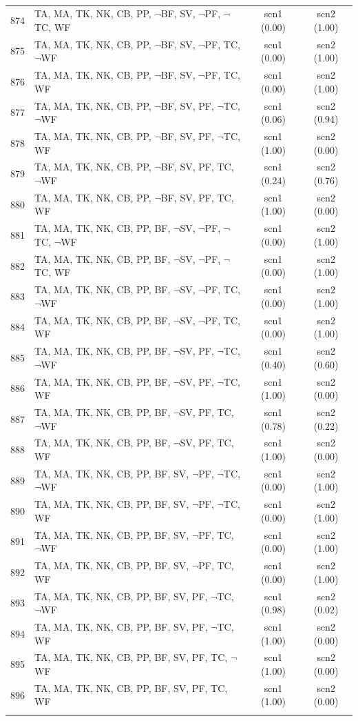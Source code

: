 \documentclass[12pt]{article}
\begin{document}
\begin{longtable}{|l|l|c|c|}
874 & TA, MA, TK, NK, CB, PP, $\neg$BF, SV, $\neg$PF, $\neg$TC, WF & scn1 (0.00) & scn2 (1.00)\\
875 & TA, MA, TK, NK, CB, PP, $\neg$BF, SV, $\neg$PF, TC, $\neg$WF & scn1 (0.00) & scn2 (1.00)\\
876 & TA, MA, TK, NK, CB, PP, $\neg$BF, SV, $\neg$PF, TC, WF & scn1 (0.00) & scn2 (1.00)\\
877 & TA, MA, TK, NK, CB, PP, $\neg$BF, SV, PF, $\neg$TC, $\neg$WF & scn1 (0.06) & scn2 (0.94)\\
878 & TA, MA, TK, NK, CB, PP, $\neg$BF, SV, PF, $\neg$TC, WF & scn1 (1.00) & scn2 (0.00)\\
879 & TA, MA, TK, NK, CB, PP, $\neg$BF, SV, PF, TC, $\neg$WF & scn1 (0.24) & scn2 (0.76)\\
880 & TA, MA, TK, NK, CB, PP, $\neg$BF, SV, PF, TC, WF & scn1 (1.00) & scn2 (0.00)\\
881 & TA, MA, TK, NK, CB, PP, BF, $\neg$SV, $\neg$PF, $\neg$TC, $\neg$WF & scn1 (0.00) & scn2 (1.00)\\
882 & TA, MA, TK, NK, CB, PP, BF, $\neg$SV, $\neg$PF, $\neg$TC, WF & scn1 (0.00) & scn2 (1.00)\\
883 & TA, MA, TK, NK, CB, PP, BF, $\neg$SV, $\neg$PF, TC, $\neg$WF & scn1 (0.00) & scn2 (1.00)\\
884 & TA, MA, TK, NK, CB, PP, BF, $\neg$SV, $\neg$PF, TC, WF & scn1 (0.00) & scn2 (1.00)\\
885 & TA, MA, TK, NK, CB, PP, BF, $\neg$SV, PF, $\neg$TC, $\neg$WF & scn1 (0.40) & scn2 (0.60)\\
886 & TA, MA, TK, NK, CB, PP, BF, $\neg$SV, PF, $\neg$TC, WF & scn1 (1.00) & scn2 (0.00)\\
887 & TA, MA, TK, NK, CB, PP, BF, $\neg$SV, PF, TC, $\neg$WF & scn1 (0.78) & scn2 (0.22)\\
888 & TA, MA, TK, NK, CB, PP, BF, $\neg$SV, PF, TC, WF & scn1 (1.00) & scn2 (0.00)\\
889 & TA, MA, TK, NK, CB, PP, BF, SV, $\neg$PF, $\neg$TC, $\neg$WF & scn1 (0.00) & scn2 (1.00)\\
890 & TA, MA, TK, NK, CB, PP, BF, SV, $\neg$PF, $\neg$TC, WF & scn1 (0.00) & scn2 (1.00)\\
891 & TA, MA, TK, NK, CB, PP, BF, SV, $\neg$PF, TC, $\neg$WF & scn1 (0.00) & scn2 (1.00)\\
892 & TA, MA, TK, NK, CB, PP, BF, SV, $\neg$PF, TC, WF & scn1 (0.00) & scn2 (1.00)\\
893 & TA, MA, TK, NK, CB, PP, BF, SV, PF, $\neg$TC, $\neg$WF & scn1 (0.98) & scn2 (0.02)\\
894 & TA, MA, TK, NK, CB, PP, BF, SV, PF, $\neg$TC, WF & scn1 (1.00) & scn2 (0.00)\\
895 & TA, MA, TK, NK, CB, PP, BF, SV, PF, TC, $\neg$WF & scn1 (1.00) & scn2 (0.00)\\
896 & TA, MA, TK, NK, CB, PP, BF, SV, PF, TC, WF & scn1 (1.00) & scn2 (0.00)\\
\hline 
\caption{} 
\label{} 
\end{longtable}
\end{document}
